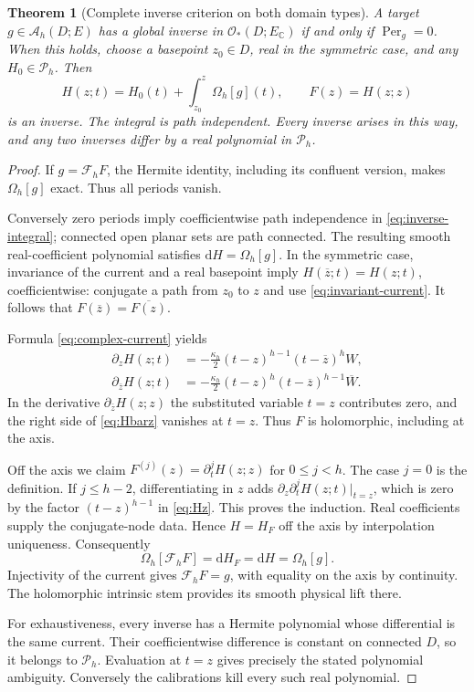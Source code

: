 \documentclass[11pt,a4paper]{article}
\numberwithin{equation}{section}
\newtheorem{theorem}{Theorem}[section]
\theoremstyle{definition}
\theoremstyle{remark}
\newcommand{\C}{\mathbb C}
\newcommand{\Hol}{\mathcal O}
\newcommand{\A}{\mathcal A_h}
\newcommand{\Fu}{\mathcal F_h}
\newcommand{\Pspace}{\mathscr P_h}
\newcommand{\Per}{\operatorname{Per}}
\newcommand{\barz}{\overline z}
\newcommand{\dbar}{\partial_{\bar z}}
\begin{document}
\begin{theorem}[Complete inverse criterion on both domain types]
\label{thm:inverse}
A target $g\in\A(D;E)$ has a global inverse in $\Hol_*(D;E_\C)$ if and only
if $\Per_g=0$. When this holds, choose a basepoint $z_0\in D$, real in the
symmetric case, and any $H_0\in\Pspace$. Then
\begin{equation}\label{eq:inverse-integral}
 H(z;t)=H_0(t)+\int_{z_0}^{z}\Omega_h[g](t),
 \qquad F(z)=H(z;z)
\end{equation}
is an inverse. The integral is path independent. Every inverse arises in this
way, and any two inverses differ by a real polynomial in $\Pspace$.
\end{theorem}
\begin{proof}
If $g=\Fu F$, the Hermite identity, including its confluent version, makes
$\Omega_h[g]$ exact. Thus all periods vanish.

Conversely zero periods imply coefficientwise path independence in
\eqref{eq:inverse-integral}; connected open planar sets are path connected.
The resulting smooth real-coefficient polynomial satisfies
$\mathrm dH=\Omega_h[g]$. In the symmetric case, invariance of the current
and a real basepoint imply $H(\barz;t)=H(z;t)$, coefficientwise: conjugate a
path from $z_0$ to $z$ and use \eqref{eq:invariant-current}. It follows that
$F(\barz)=\overline{F(z)}$.

Formula \eqref{eq:complex-current} yields
\begin{align}
 \partial_zH(z;t)&=-\frac{\kappa_h}{2}
             (t-z)^{h-1}(t-\barz)^hW,\label{eq:Hz}\\
 \dbar H(z;t)&=-\frac{\kappa_h}{2}
             (t-z)^h(t-\barz)^{h-1}\overline W.\label{eq:Hbarz}
\end{align}
In the derivative $\dbar H(z;z)$ the substituted variable $t=z$ contributes
zero, and the right side of \eqref{eq:Hbarz} vanishes at $t=z$. Thus $F$ is
holomorphic, including at the axis.

Off the axis we claim
$F^{(j)}(z)=\partial_t^jH(z;z)$ for $0\le j<h$. The case $j=0$ is the
definition. If $j\le h-2$, differentiating in $z$ adds
$\partial_z\partial_t^jH(z;t)|_{t=z}$, which is zero by the factor
$(t-z)^{h-1}$ in \eqref{eq:Hz}. This proves the induction. Real coefficients
supply the conjugate-node data. Hence $H=H_F$ off the axis by interpolation
uniqueness. Consequently
\[
 \Omega_h[\Fu F]=\mathrm dH_F=\mathrm dH=\Omega_h[g].
\]
Injectivity of the current gives $\Fu F=g$, with equality on the axis by
continuity. The holomorphic intrinsic stem provides its smooth physical
lift there.

For exhaustiveness, every inverse has a Hermite polynomial whose differential
is the same current. Their coefficientwise difference is constant on connected
$D$, so it belongs to $\Pspace$. Evaluation at $t=z$ gives precisely the
stated polynomial ambiguity. Conversely the calibrations kill every such
real polynomial.
\end{proof}
\end{document}
